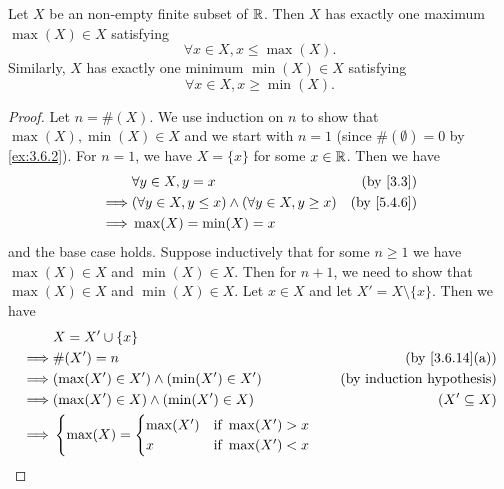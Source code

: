 \begin{ac}\label{ac:5.4.1}
  Let \(X\) be an non-empty finite subset of \(\mathbb{R}\).
  Then \(X\) has exactly one maximum \(\max(X) \in X\) satisfying
  \[
    \forall x \in X, x \leq \max(X).
  \]
  Similarly, \(X\) has exactly one minimum \(\min(X) \in X\) satisfying
  \[
    \forall x \in X, x \geq \min(X).
  \]
\end{ac}

\begin{proof}
  Let \(n = \#(X)\).
  We use induction on \(n\) to show that \(\max(X), \min(X) \in X\) and we start with \(n = 1\) (since \(\#(\emptyset) = 0\) by \cref{ex:3.6.2}).
  For \(n = 1\), we have \(X = \{x\}\) for some \(x \in \mathbb{R}\).
  Then we have
  \begin{align*}
             & \forall y \in X, y = x                                        & \text{(by \cref{3.3})}   \\
    \implies & (\forall y \in X, y \leq x) \land (\forall y \in X, y \geq x) & \text{(by \cref{5.4.6})} \\
    \implies & \max(X) = \min(X) = x
  \end{align*}
  and the base case holds.
  Suppose inductively that for some \(n \geq 1\) we have \(\max(X) \in X\) and \(\min(X) \in X\).
  Then for \(n + 1\), we need to show that \(\max(X) \in X\) and \(\min(X) \in X\).
  Let \(x \in X\) and let \(X' = X \setminus \{x\}\).
  Then we have
  \begin{align*}
             & X = X' \cup \{x\}                                                                                                            \\
    \implies & \#(X') = n                                                                                & \text{(by \cref{3.6.14}(a))}     \\
    \implies & (\max(X') \in X') \land (\min(X') \in X')                                                 & \text{(by induction hypothesis)} \\
    \implies & (\max(X') \in X) \land (\min(X') \in X)                                                   & (X' \subseteq X)                 \\
    \implies & \begin{cases}
                 \max(X) = \begin{cases}
                  \max(X') & \text{if } \max(X') > x \\
                  x        & \text{if } \max(X') < x
                \end{cases} \\

\end{cases}
\end{align*}
\end{proof}
